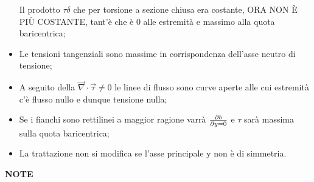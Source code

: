 \documentclass{article}
\begin{document}
\begin{adjustwidth}{2in}{}
\begin{itemize}
			Il prodotto $\tau\delta$ che per torsione a sezione chiusa era costante, ORA NON È PIÙ COSTANTE, tant'è che è $0$ alle estremità e massimo alla quota baricentrica;
			\item Le
			tensioni tangenziali sono massime in corrispondenza dell’asse neutro di tensione;
			\item A seguito della \( \vec{\nabla}\cdot\vec{\tau}\ne0\) le
			linee di flusso sono curve aperte alle cui estremità c'è flusso nullo e dunque tensione nulla;
			\item Se i fianchi sono rettilinei a maggior ragione varrà \( \partial b\over\partial y = 0\) e $\tau$ sarà massima sulla quota baricentrica;
			\item La trattazione non si modifica se l’asse principale y non è di simmetria.
		\end{itemize}
		
		
			
		
		 
		 
		 
		 

		


		
		
	
	
		
		
	
			
	
	\newpage
	{\Large \textbf{NOTE}}

		\end{adjustwidth}
\end{document}
